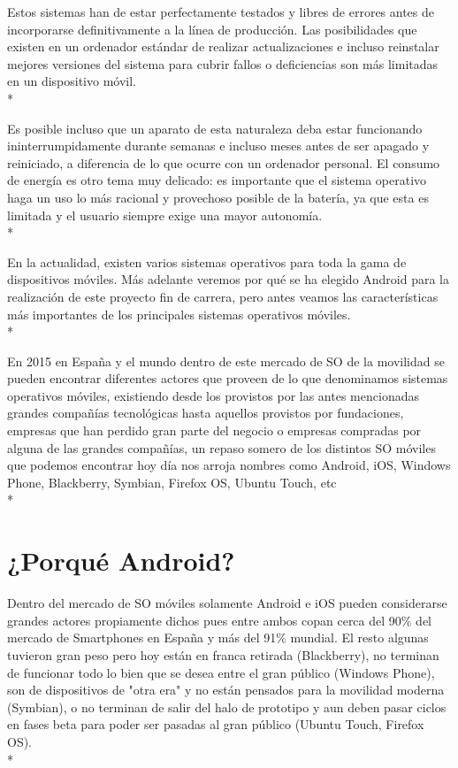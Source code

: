 \documentclass[../pfc.tex]{subfiles}
\begin{document}
	Estos sistemas han de estar perfectamente testados y libres de errores antes de incorporarse definitivamente a la línea de producción. Las posibilidades que existen en un ordenador estándar de realizar actualizaciones e incluso reinstalar mejores versiones del sistema para cubrir fallos o deficiencias son más limitadas en un dispositivo móvil.\\*
	
	Es posible incluso que un aparato de esta naturaleza deba estar funcionando ininterrumpidamente durante semanas e incluso meses antes de ser apagado y reiniciado, a diferencia de lo que ocurre con un ordenador personal. El consumo de energía es otro tema muy delicado: es importante que el sistema operativo haga un uso lo más racional y provechoso posible de la batería, ya que esta es limitada y el usuario siempre exige una mayor autonomía.\\*
	
	En la actualidad, existen varios sistemas operativos para toda la gama de dispositivos móviles. Más adelante veremos por qué se ha elegido Android para la realización de este proyecto fin de carrera, pero antes veamos las características más importantes de los principales sistemas operativos móviles.\\*
	
	En 2015 en España y el mundo dentro de este mercado de SO de la movilidad se pueden encontrar diferentes actores que proveen de lo que denominamos sistemas operativos móviles, existiendo desde los provistos por las antes mencionadas grandes compañías tecnológicas hasta aquellos provistos por fundaciones, empresas que han perdido gran parte del negocio o empresas compradas por alguna de las grandes compañías, un repaso somero de los distintos SO móviles que podemos encontrar hoy día nos arroja nombres como Android, iOS, Windows Phone, Blackberry, Symbian, Firefox OS, Ubuntu Touch, etc\\*
		
	\section{¿Porqué Android?}
	
	Dentro del mercado de SO móviles solamente Android e iOS pueden considerarse grandes actores propiamente dichos pues entre ambos copan cerca del 90\% del mercado de Smartphones en España y más del 91\% mundial\cite{usomundso}. El resto algunas tuvieron gran peso pero hoy están en franca retirada (Blackberry), no terminan de funcionar todo lo bien que se desea entre el gran público (Windows Phone), son de dispositivos de "otra era" y no están pensados para la movilidad moderna (Symbian), o no terminan de salir del halo de prototipo y aun deben pasar ciclos en fases beta para  poder ser pasadas al gran público (Ubuntu Touch, Firefox OS).\\*
	
\end{document}
